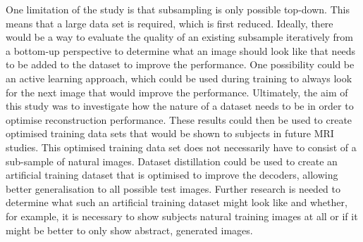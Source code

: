 One limitation of the study is that subsampling is only possible top-down. This means that a large data set is required, which is first reduced. Ideally, there would be a way to evaluate the quality of an existing subsample iteratively from a bottom-up perspective  to determine what an image should look like that needs to be added to the dataset to improve the performance. One possibility could be an active learning approach\cite{senerActiveLearningConvolutional2018, guoDeepCoreComprehensiveLibrary2022}, which could be used during training to always look for the next image that would improve the performance. Ultimately, the aim of this study was to investigate how the nature of a dataset needs to be in order to optimise reconstruction performance. These results could then be used to create optimised training data sets that would be shown to subjects in future MRI studies. This optimised training data set does not necessarily have to consist of a sub-sample of natural images. Dataset distillation\cite{wangDatasetDistillation2018,yuDatasetDistillationComprehensive2024} could be used to create an artificial training dataset that is optimised to improve the decoders, allowing better generalisation to all possible test images. Further research is needed to determine what such an artificial training dataset might look like and whether, for example, it is necessary to show subjects natural training images at all or if it might be better to only show abstract, generated images. 




